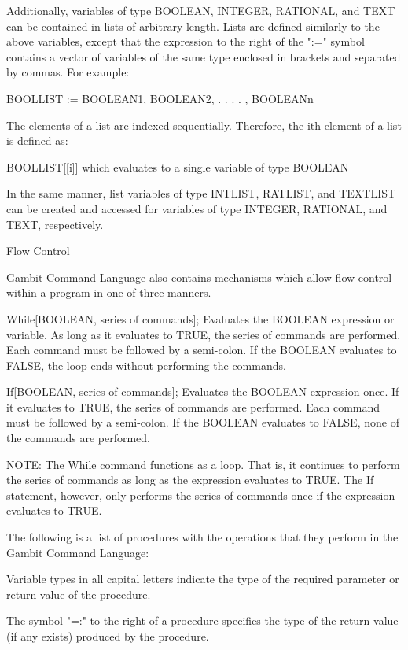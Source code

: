 Additionally, variables of type BOOLEAN, INTEGER, RATIONAL, and TEXT can be 
contained in lists of arbitrary length.  Lists are defined similarly to the 
above variables, except that the expression to the right of the ":=" symbol
contains a vector of variables of the same type enclosed in brackets and
separated by commas.  For example:

	BOOLLIST := { BOOLEAN1, BOOLEAN2, . . . . , BOOLEANn }

The elements of a list are indexed sequentially.  Therefore, the ith element of
a list is defined as:

	BOOLLIST[[i]]	which evaluates to a single variable of type BOOLEAN

In the same manner, list variables of type INTLIST, RATLIST, and TEXTLIST can
be created and accessed for variables of type INTEGER, RATIONAL, and TEXT, 
respectively.


Flow Control

Gambit Command Language also contains mechanisms which allow flow control 
within a program in one of three manners.

While[BOOLEAN, {series of commands}];	Evaluates the BOOLEAN expression or
					variable.  As long as it evaluates to
					TRUE, the series of commands are 
					performed.  Each command must be 
					followed by a semi-colon.  If the
					BOOLEAN evaluates to FALSE, the loop
					ends without performing the commands.

If[BOOLEAN, {series of commands}];	Evaluates the BOOLEAN expression once.
					If it evaluates to TRUE, the series of
					commands are performed.  Each command
					must be followed by a semi-colon.  If
					the BOOLEAN evaluates to FALSE, none
					of the commands are performed.

	NOTE:	The While command functions as a loop.  That is, it continues
		to perform the series of commands as long as the expression
		evaluates to TRUE.  The If statement, however, only performs
		the series of commands once if the expression evaluates to
		TRUE.


The following is a list of procedures with the operations that they perform
in the Gambit Command Language:

Variable types in all capital letters indicate the type of the required
parameter or return value of the procedure.

The symbol "=:" to the right of a procedure specifies the type of the return
value (if any exists) produced by the procedure.

